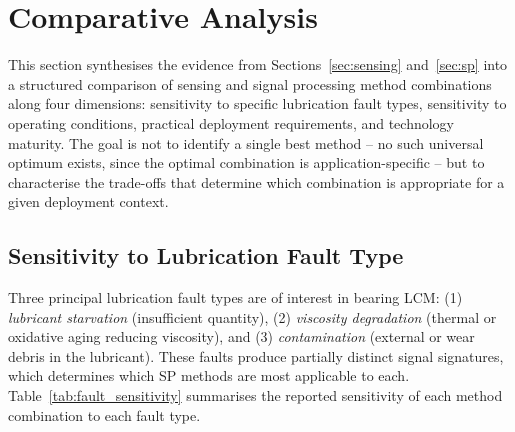 \section{Comparative Analysis}
\label{sec:comparative}

This section synthesises the evidence from Sections~\ref{sec:sensing} and~\ref{sec:sp} into a structured comparison of sensing and signal processing method combinations along four dimensions: sensitivity to specific lubrication fault types, sensitivity to operating conditions, practical deployment requirements, and technology maturity. The goal is not to identify a single best method -- no such universal optimum exists, since the optimal combination is application-specific -- but to characterise the trade-offs that determine which combination is appropriate for a given deployment context.

\subsection{Sensitivity to Lubrication Fault Type}
\label{subsec:comp_fault}

Three principal lubrication fault types are of interest in bearing LCM: (1) \textit{lubricant starvation} (insufficient quantity), (2) \textit{viscosity degradation} (thermal or oxidative aging reducing viscosity), and (3) \textit{contamination} (external or wear debris in the lubricant). These faults produce partially distinct signal signatures, which determines which SP methods are most applicable to each. Table~\ref{tab:fault_sensitivity} summarises the reported sensitivity of each method combination to each fault type.

